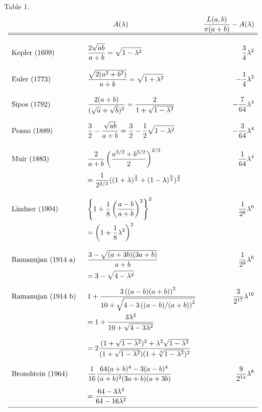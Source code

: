 \documentclass[12pt]{article}
\begin{document}
\noindent Table 1.
\footnotesize
$$
\begin{array}{llr}
 & \hspace{.5in} A(\lambda) &  \displaystyle{\frac{L(a,b)}{ \pi
(a+b)} - A(\lambda)}
\\    \hline  \hline \\
\mbox{Kepler (1609)} \hspace{.5in}  &
 \displaystyle{\frac{2\sqrt{ab}}{a+b}=\sqrt{1-\lambda^2}} &  
\displaystyle{\frac{3}{4}\lambda^2} 
\\ [4ex] 
\mbox{Euler (1773)} \hspace{.5in}  &
\displaystyle{\frac{\sqrt{2(a^2+b^2)}}{a+b}= \sqrt{1+\lambda^2} } & 
\displaystyle{-\frac{1}{4}\lambda^2} 
\\ [4ex] 
\mbox{Sipos (1792)} \hspace{.5in}   &
\displaystyle{\frac{2(a+b)}{(\sqrt{a}+\sqrt{b})^2}= \frac{2}{1 + 
\sqrt{1-\lambda^2}
}} & 
\displaystyle{-\frac{7}{64}\lambda^4} 
\\ [4ex] 
\mbox{Peano (1889)} \hspace{.5in}   &
\displaystyle{ \frac{3}{2}-\frac{\sqrt{ab}}{a+b}=
\frac{3}{2}-\frac{1}{2}\sqrt{1-\lambda^2} } & 
\displaystyle{-\frac{3}{64}\lambda^4}\\ [4ex]
 \mbox{Muir (1883)}  &
\displaystyle{\frac{2}{a+b}\left(\frac{a^{3/2}+b^{3/2}}{2}\right)^{2/3}} 
& 
\displaystyle{\frac{1}{64}\lambda^4}
\\ [3ex] &
\displaystyle{=\frac{1}{2^{2/3}}((1+\lambda)^{\frac{3}{2}}+(1-\lambda)^{\frac{3}{2}}})^{\frac{2}{3}}
&
\\ [4ex] 
\mbox{Lindner (1904)}  & 
\displaystyle{\left\{ 1+\frac{1}{8} 
\left(\frac{a-b}{a+b}\right)^2\right\}^2} &
\displaystyle{ \frac{1}{2^8}\lambda^6}
\\ [3ex]
 & \displaystyle{=\left(1+\frac{1}{8}\lambda^2\right)^2}  & \\
 & & \\  \mbox{Ramanujan  (1914 a)} &
\displaystyle{\frac{3-\sqrt{(a+3b)(3a+b)}}{a+b}} & 
\displaystyle{ \frac{1}{2^9}\lambda^6}
\\  [2ex] &
\displaystyle{=3-\sqrt{4-\lambda^2}}  &
\\ [2ex] 
 \mbox{Ramanujan (1914 b)}  &  
\displaystyle{1 +\frac{3 \left((a-b)(a+b)\right) ^2}{10 +
\sqrt{4-3\left((a-b)/(a+b)\right) ^2}}} & 
\displaystyle{\frac{3}{2^{17}}\lambda^{10}}
\\ [4ex]
 & \displaystyle{=1+\frac{3\lambda^2}{10+\sqrt{4-3\lambda^2}}}  &
\\ [4ex] 
& \displaystyle{=2 \frac{ ( 1 +  \sqrt{1-\lambda^2})^2 + \lambda^2
\sqrt{1-\lambda^2}}  {( 1 +  \sqrt{1-\lambda^2}) 
(1+\sqrt[4]{1-\lambda^2})^2}}  &
\\ [4ex]
 \mbox{Bronshtein (1964)} &
\displaystyle{\frac{1}{16}\frac{64(a+b)^4-3(a-b)^4}{(a+b)^2(3a+b)(a+3b)}} 
& 
\displaystyle{\frac{9}{2^{14}}\lambda^{8}}
\\ [3ex] 
& \displaystyle{=\frac{ 64-3\lambda^4}  {64-16\lambda^2}}  &
\\ [2ex] \hline
\end{array}
$$
\end{document}
